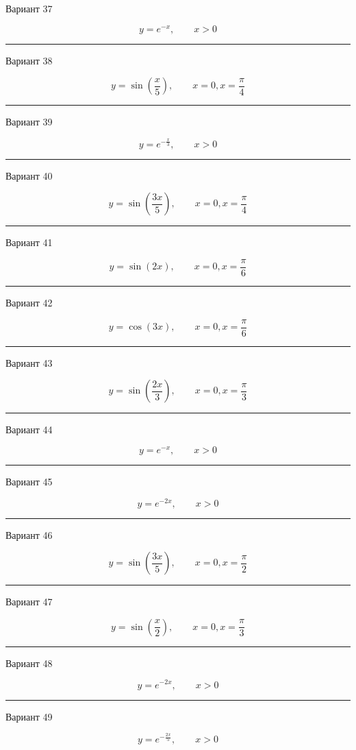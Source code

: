 \documentclass[11pt]{report}
\begin{document}
Вариант 37

$$y=e^{- x}, \qquad x > 0$$

\rule{\textwidth}{.2mm}

Вариант 38

$$y=\sin{\left(\frac{x}{5} \right)}, \qquad x = 0, x = \frac{\pi}{4}$$

\rule{\textwidth}{.2mm}

Вариант 39

$$y=e^{- \frac{x}{3}}, \qquad x > 0$$

\rule{\textwidth}{.2mm}

Вариант 40

$$y=\sin{\left(\frac{3 x}{5} \right)}, \qquad x = 0, x = \frac{\pi}{4}$$

\rule{\textwidth}{.2mm}

Вариант 41

$$y=\sin{\left(2 x \right)}, \qquad x = 0, x = \frac{\pi}{6}$$

\rule{\textwidth}{.2mm}

Вариант 42

$$y=\cos{\left(3 x \right)}, \qquad x = 0, x = \frac{\pi}{6}$$

\rule{\textwidth}{.2mm}

Вариант 43

$$y=\sin{\left(\frac{2 x}{3} \right)}, \qquad x = 0, x = \frac{\pi}{3}$$

\rule{\textwidth}{.2mm}

Вариант 44

$$y=e^{- x}, \qquad x > 0$$

\rule{\textwidth}{.2mm}

Вариант 45

$$y=e^{- 2 x}, \qquad x > 0$$

\rule{\textwidth}{.2mm}

Вариант 46

$$y=\sin{\left(\frac{3 x}{5} \right)}, \qquad x = 0, x = \frac{\pi}{2}$$

\rule{\textwidth}{.2mm}

Вариант 47

$$y=\sin{\left(\frac{x}{2} \right)}, \qquad x = 0, x = \frac{\pi}{3}$$

\rule{\textwidth}{.2mm}

Вариант 48

$$y=e^{- 2 x}, \qquad x > 0$$

\rule{\textwidth}{.2mm}

Вариант 49

$$y=e^{- \frac{2 x}{5}}, \qquad x > 0$$
\end{document}
